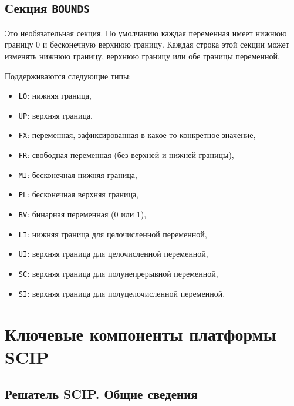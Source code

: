 \documentclass[%
	11pt,
	a4paper,
	utf8,
		]{article}
\begin{document}
\subsection{Секция \texttt{BOUNDS}}

Это необязательная секция. По умолчанию каждая переменная имеет нижнюю границу 0 и бесконечную верхнюю границу. Каждая строка этой секции может изменять нижнюю границу, верхнюю границу или обе границы переменной. 

Поддерживаются следующие типы:
\begin{itemize}
	\item \verb|LO|: нижняя граница,
	
	\item \verb|UP|: верхняя граница,
	
	\item \verb|FX|: переменная, зафиксированная в какое-то конкретное значение,
	
	\item \verb|FR|: свободная переменная (без верхней и нижней границы),
	
	\item \verb|MI|: бесконечная нижняя граница,
	
	\item \verb|PL|: бесконечная верхняя граница,
	
	\item \verb|BV|: бинарная переменная (0 или 1),
	
	\item \verb|LI|: нижняя граница для целочисленной переменной,
	
	\item \verb|UI|: верхняя граница для целочисленной переменной,
	
	\item \verb|SC|: верхняя граница для полунепрерывной переменной,
	
	\item \verb|SI|: верхняя граница для полуцелочисленной переменной.
\end{itemize}






\section{Ключевые компоненты платформы SCIP}

\subsection{Решатель SCIP. Общие сведения}
\end{document}
